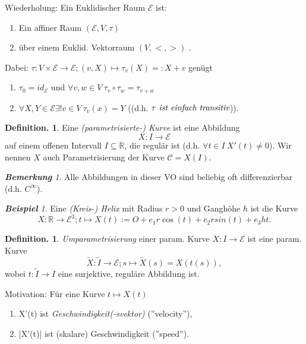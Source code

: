 \documentclass[a4paper,oneside,11pt,DIV=12,parskip=half]{scrartcl}
\newcommand{\R}{\mathbb R}
\theoremstyle{plain}
\theoremstyle{definition}
\newtheorem{definition}[theorem]{Definition.}
\newtheorem{remark, definition}[theorem]{Bemerkung und Definition.}
\newtheorem{lemma, definition}[theorem]{Lemma und Definition.}
\theoremstyle{remark}
\newtheorem*{remark}{\textbf{Bemerkung}}
\newtheorem*{example}{\textbf{Beispiel}}
\newtheorem*{remark, example}{\textbf{Bemerkung und Beispiel}}
\begin{document}
Wiederholung: Ein Euklidischer Raum $\mathcal{E}$ ist:
\begin{enumerate}
	\item Ein affiner Raum $(\mathcal{E},V,\tau)$ 
	\item über einem Euklid. Vektorraum $(V,<,>)$ .
\end{enumerate}

	Dabei: $\tau: V\times \mathcal{E} \rightarrow \mathcal{E}; (v,X) \mapsto \tau_v(X)=:X+v$ genügt
	\begin{enumerate}
		\item $\tau_0 = id_{\mathcal{E}}$ und $\forall v,w \in V ~ \tau_v \circ \tau_w = \tau_{v+w}$
		\item $\forall X,Y \in \mathcal{E} \exists! v \in V ~ \tau_v(x) = Y$ ((d.h. $\tau  \emph{ ist einfach transitiv}$)).
	\end{enumerate}
	
	
\begin{definition}
	Eine \emph{(parametrisierte-) Kurve} ist eine Abbildung \[X: I \rightarrow \mathcal{E}\] auf einem offenen Intervall $I \subseteq \R$, die regulär ist (d.h. $\forall t \in I ~ X'(t) \not = 0$).
	Wir nennen $X$ auch Parametrisierung der Kurve $\mathcal{C} = X(I)$.
\end{definition}

\begin{remark}
	Alle Abbildungen in dieser VO sind beliebig oft differenzierbar (d.h. $C^{\infty}$).
\end{remark}

\begin{example}
	Eine \emph{(Kreis-) Helix} mit Radius $r>0$ und Ganghöhe $h$ ist die Kurve
	\[X: \R \rightarrow \mathcal{E}^3; t \mapsto X(t) := O + e_1r\cos(t) + e_2rsin(t) + e_3ht. \]
\end{example}

\begin{definition}
	\emph{Umparametrisierung} einer param. Kurve $X: I \rightarrow \mathcal{E}$ ist eine param. Kurve
	\[\widetilde{X}: \widetilde{I} \rightarrow \mathcal{E}; s \mapsto \widetilde{X}(s)=X(t(s)),\]
	wobei $t: \widetilde{I} \rightarrow I$ eine surjektive, reguläre Abbildung ist.

\end{definition}

Motivation: Für eine Kurve $t \mapsto X(t)$ 
\begin{enumerate}
	\item X'(t) ist \emph{Geschwindigkeit(-svektor)} (''velocity''),
	\item |X'(t)| ist (skalare) Geschwindigkeit (''speed'').
\end{enumerate}
\end{document}
